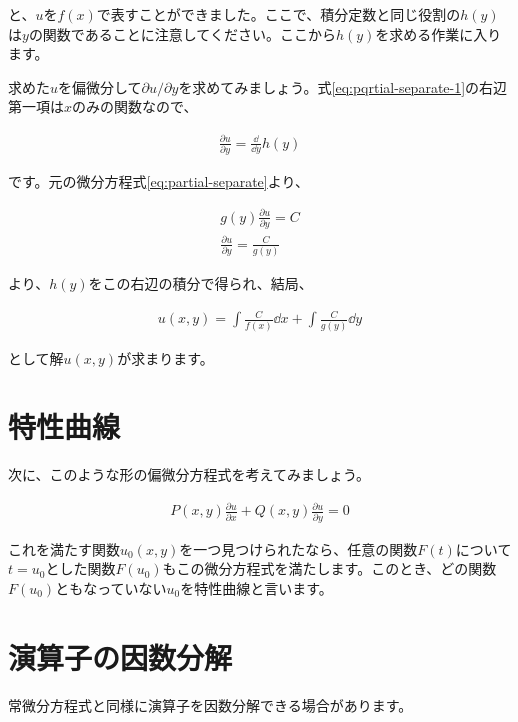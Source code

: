 \noindent
と、$u$を$f(x)$で表すことができました。ここで、積分定数と同じ役割の$h(y)$は$y$の関数であることに注意してください。ここから$h(y)$を求める作業に入ります。

求めた$u$を偏微分して$\partial u/\partial y$を求めてみましょう。式\ref{eq:pqrtial-separate-1}の右辺第一項は$x$のみの関数なので、

\begin{eqnarray}
    \frac{\partial u}{\partial y}=\frac{\dd}{\dd y}h(y)
\end{eqnarray}

\noindent
です。元の微分方程式\ref{eq:partial-separate}より、

\begin{eqnarray}
    g(y)\frac{\partial u}{\partial y}=C \\
    \frac{\partial u}{\partial y}=\frac{C}{g(y)}
\end{eqnarray}

\noindent
より、$h(y)$をこの右辺の積分で得られ、結局、

\begin{eqnarray}
    u(x,y)=\int\frac{C}{f(x)}\dd x+\int\frac{C}{g(y)}\dd y
\end{eqnarray}

\noindent
として解$u(x,y)$が求まります。








\section{特性曲線}
\label{char-curve}
次に、このような形の偏微分方程式を考えてみましょう。

\begin{eqnarray}
    P(x,y)\frac{\partial u}{\partial x}+Q(x,y)\frac{\partial u}{\partial y}=0
\end{eqnarray}

これを満たす関数$u_0(x,y)$を一つ見つけられたなら、任意の関数$F(t)$について$t=u_0$とした関数$F(u_0)$もこの微分方程式を満たします。このとき、どの関数$F(u_0)$ともなっていない$u_0$を特性曲線と言います。









\section{演算子の因数分解}
\label{pqrtial-factorization}
常微分方程式と同様に演算子を因数分解できる場合があります。


